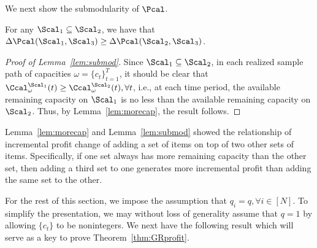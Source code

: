 We next show the submodularity of $\Pcal$.
\begin{lemma}\label{lem:submod}
	For any $\Scal_1\subseteq\Scal_2$, we have that $\Delta\Pcal(\Scal_1,\Scal_3)\ge \Delta\Pcal(\Scal_2,\Scal_3)$.
\end{lemma}
\begin{proof}[Proof of Lemma~\ref{lem:submod}]
Since $\Scal_1\subseteq\Scal_2$, in each realized sample path of capacities $\omega = \{c_t\}_{t=1}^T$, it should be clear that $\Ccal_\omega^{\Scal_1}(t)\ge \Ccal_\omega^{\Scal_2}(t), \forall t$, i.e., at each time period, the available remaining capacity on $\Scal_1$ is no less than the available remaining capacity on $\Scal_2$. Thus, by Lemma~\ref{lem:morecap}, the result follows.
\end{proof}

Lemma~\ref{lem:morecap} and Lemma~\ref{lem:submod} showed the relationship of incremental profit change of adding a set of items on top of two other sets of items. Specifically, if one set always has more remaining capacity than the other set, then adding a third set to one generates more incremental profit than adding the same set to the other. 



For the rest of this section, we impose the assumption that $q_i = q, \forall i\in[N]$. To simplify the presentation, we may without loss of generality assume that $q=1$ by allowing $\{c_t\}$ to be nonintegers.
We next have the following result which will serve as a key to prove Theorem~\ref{thm:GRprofit}.

